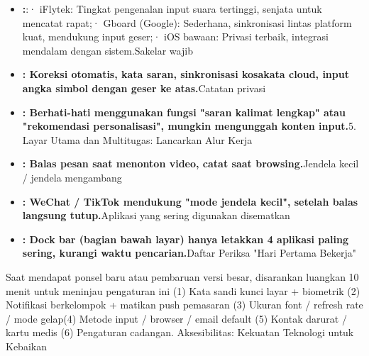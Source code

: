 
\begin{itemize}
  \item \textbf{:}:\newline · iFlytek: Tingkat pengenalan input suara tertinggi, senjata untuk mencatat rapat;\newline · Gboard (Google): Sederhana, sinkronisasi lintas platform kuat, mendukung input geser;\newline · iOS bawaan: Privasi terbaik, integrasi mendalam dengan sistem.\newline Sakelar wajib
  \item \textbf{: Koreksi otomatis, kata saran, sinkronisasi kosakata cloud, input angka simbol dengan geser ke atas.}Catatan privasi
  \item \textbf{: Berhati-hati menggunakan fungsi "saran kalimat lengkap" atau "rekomendasi personalisasi", mungkin mengunggah konten input.}5. Layar Utama dan Multitugas: Lancarkan Alur Kerja
\end{itemize}


\begin{itemize}
  \item \textbf{: Balas pesan saat menonton video, catat saat browsing.}Jendela kecil / jendela mengambang
  \item \textbf{: WeChat / TikTok mendukung "mode jendela kecil", setelah balas langsung tutup.}Aplikasi yang sering digunakan disematkan
  \item \textbf{: Dock bar (bagian bawah layar) hanya letakkan 4 aplikasi paling sering, kurangi waktu pencarian.}Daftar Periksa "Hari Pertama Bekerja"
\end{itemize}

\begin{tcbinfo}{Saat mendapat ponsel baru atau pembaruan versi besar, disarankan luangkan 10 menit untuk meninjau pengaturan ini}
(1) Kata sandi kunci layar + biometrik (2) Notifikasi berkelompok + matikan push pemasaran (3) Ukuran font / refresh rate / mode gelap\newline (4) Metode input / browser / email default (5) Kontak darurat / kartu medis (6) Pengaturan cadangan. Aksesibilitas: Kekuatan Teknologi untuk Kebaikan

\end{tcbinfo}

